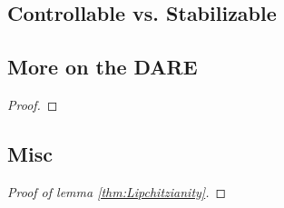 \documentclass[12pt]{article}
\begin{document}
\subsection*{Controllable vs. Stabilizable}\label{sec:controllability-stabilizability}

\subsection*{More on the DARE}\label{sec:DARE}

\begin{lemma}
	
\end{lemma}

\begin{proof}
	
\end{proof}

\subsection*{Misc}

\begin{proof}[Proof of lemma \ref{thm:Lipchitzianity}]

\end{proof}
\end{document}
